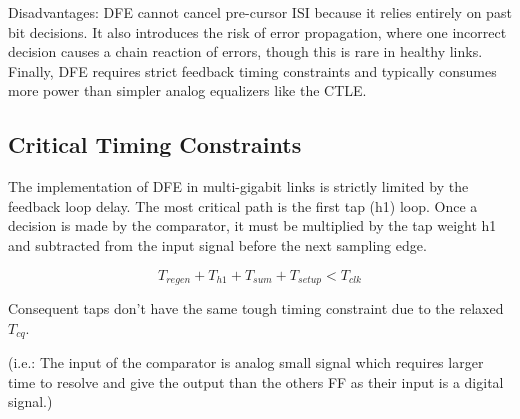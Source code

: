 Disadvantages:
DFE cannot cancel pre-cursor ISI because it relies entirely on past bit decisions. It also introduces the risk of error propagation,
 where one incorrect decision causes a chain reaction of errors, though this is rare in healthy links. Finally,
  DFE requires strict feedback timing constraints and typically consumes more power than simpler analog equalizers like the CTLE.

\subsection{Critical Timing Constraints}
The implementation of DFE in multi-gigabit links is strictly limited by the feedback loop delay. The most critical path is the first tap (h1) loop.
 Once a decision is made by the comparator, 
it must be multiplied by the tap weight h1 and subtracted from the input signal before the next sampling edge.

\begin{equation}
    T_{regen} + T_{h1} + T_{sum} + T_{setup} < T_{clk} \tag{3.1}
\end{equation}

Consequent taps don't have the same tough timing constraint due to the relaxed $T_{cq}$.

(i.e.: The input of the comparator is analog small signal which requires larger time to resolve and give the output than the others FF as their input is a digital signal.)


